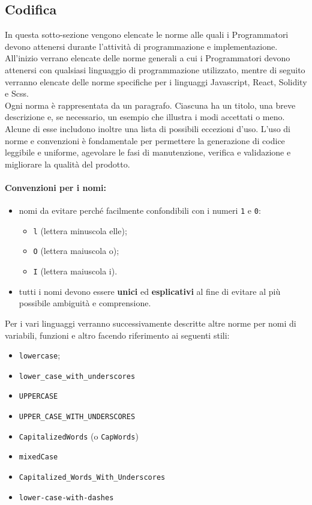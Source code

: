 \documentclass[NormeDiProgetto.tex]{subfiles}
\begin{document}
\subsection{Codifica}
In questa sotto-sezione vengono elencate le norme alle quali i Programmatori devono attenersi durante l'attività di programmazione e implementazione.\\
All'inizio verrano elencate delle norme generali a cui i Programmatori devono attenersi con qualsiasi linguaggio di programmazione utilizzato, mentre di seguito verranno elencate delle norme specifiche per i linguaggi Javascript, React, Solidity e Scss.\\
Ogni norma è rappresentata da un paragrafo. Ciascuna ha un titolo, una breve descrizione e, se necessario, un esempio che illustra i modi accettati o meno. Alcune di esse includono inoltre una lista di possibili eccezioni d'uso. L'uso di norme e convenzioni è fondamentale per permettere la generazione di codice leggibile e uniforme, agevolare le fasi di manutenzione, verifica e validazione e migliorare la qualità del prodotto.

\paragraph*{Convenzioni per i nomi: }
\begin{itemize}
	\item nomi da evitare perché facilmente confondibili con i numeri \texttt{1} e \texttt{0}:
	\begin{itemize}
		\item \texttt{l} (lettera minuscola elle);
		\item \texttt{O} (lettera maiuscola o);
		\item \texttt{I} (lettera maiuscola i).
	\end{itemize}
	\item tutti i nomi devono essere \textbf{unici} ed \textbf{esplicativi} al fine di evitare al più possibile ambiguità e comprensione.
\end{itemize}
Per i vari linguaggi verranno successivamente descritte altre norme per nomi di variabili, funzioni e altro facendo riferimento ai seguenti stili:
\begin{itemize}
	\item \texttt{lowercase};
	\item \texttt{lower\_case\_with\_underscores}
	\item \texttt{UPPERCASE}
	\item \texttt{UPPER\_CASE\_WITH\_UNDERSCORES}
	\item \texttt{CapitalizedWords} (o \texttt{CapWords})
	\item \texttt{mixedCase}
	\item \texttt{Capitalized\_Words\_With\_Underscores}
	\item \texttt{lower-case-with-dashes}	
\end{itemize}
\end{document}
